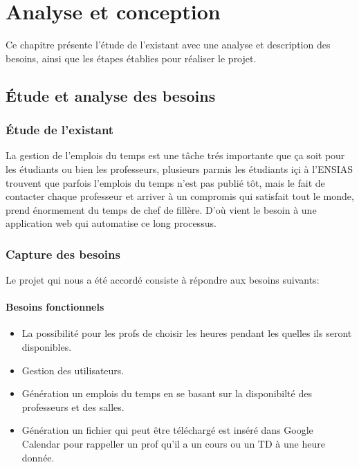 \chapter{Analyse et conception}
Ce chapitre présente l'étude de l'existant avec une analyse et description des besoins, ainsi que les étapes établies pour réaliser le projet.
\newpage

\section{Étude et analyse des besoins}
\subsection{Étude de l'existant}
La gestion de l'emplois  du temps est une tâche trés importante que ça soit pour les étudiants ou bien les professeurs, plusieurs parmis les étudiants içi à l'ENSIAS trouvent que parfois l'emplois du temps n'est pas publié tôt, mais le fait de contacter chaque professeur et arriver à un compromis qui satisfait tout le monde, prend énormement du temps de chef de fillère. D'où vient le besoin à une application web qui automatise ce long processus.
\subsection{Capture des besoins}
Le projet qui nous a été accordé consiste à répondre aux besoins suivants:
\subsubsection{Besoins fonctionnels}
\begin{itemize}
    \item La possibilité pour les profs de choisir les heures pendant les quelles ils seront disponibles.
    \item Gestion des utilisateurs.
    \item Génération un emplois du temps en se basant sur la disponibilté des professeurs et des salles.
    \item Génération un fichier qui peut être téléchargé est inséré dans Google Calendar pour rappeller un prof qu'il a un cours ou un TD à une heure donnée.
\end{itemize}

